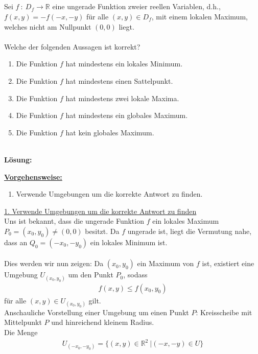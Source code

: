 \subsection*{}
Sei $ f \ : \ D_f \to \mathbb{R} $ eine ungerade Funktion zweier reellen Variablen, d.h., $f(x,y) = - f(-x,-y)$ für alle $(x,y) \in D_f$, mit einem lokalen Maximum, welches nicht am Nullpunkt $(0,0)$ liegt.\\
\\ 
Welche der folgenden Aussagen ist korrekt?
\renewcommand{\labelenumi}{(\alph{enumi})}
\begin{enumerate}
	\item Die Funktion $f$ hat mindestens ein lokales Minimum.
	\item Die Funktion $f$ hat mindestens einen Sattelpunkt.
	\item Die Funktion $f$ hat mindestens zwei lokale Maxima.
	\item Die Funktion $f$ hat mindestens ein globales Maximum.
	\item Die Funktion $f$ hat kein globales Maximum.
\end{enumerate}
\ \\
\textbf{Lösung:}
\begin{mdframed}
	\underline{\textbf{Vorgehensweise:}}
	\renewcommand{\labelenumi}{\theenumi.}
	\begin{enumerate}
		\item Verwende Umgebungen um die korrekte Antwort zu finden.
	\end{enumerate}
\end{mdframed}
\underline{1. Verwende Umgebungen um die korrekte Antwort zu finden}\\
Uns ist bekannt, dass die ungerade Funktion $f$ ein lokales Maximum $P_0 = (x_0,y_0) \neq (0,0)$ besitzt. 
Da $f$ ungerade ist, liegt die Vermutung nahe, dass an $Q_0 = (-x_0, -y_0)$ ein lokales Minimum ist.\\
\\
Dies werden wir nun zeigen: Da $(x_0,y_0)$ ein Maximum von $f$ ist, existiert eine Umgebung $U_{(x_0,y_0)}$ um den Punkt $P_0$, sodass
\begin{align*}
	f(x,y) \leq f(x_0,y_0)
\end{align*}
für alle $(x,y) \in  U_{(x_0,y_0)}$ gilt.\\
Anschauliche Vorstellung einer Umgebung um einen Punkt $P$: 
Kreisscheibe mit Mittelpunkt $P$ und hinreichend kleinem Radius.\\
Die Menge
\begin{align*}
	U_{(-x_0,-y_0)} 
	= \{
		(x,y) \in \mathbb{R}^2 \ | (-x,-y) \in U 
	\}
\end{align*}
